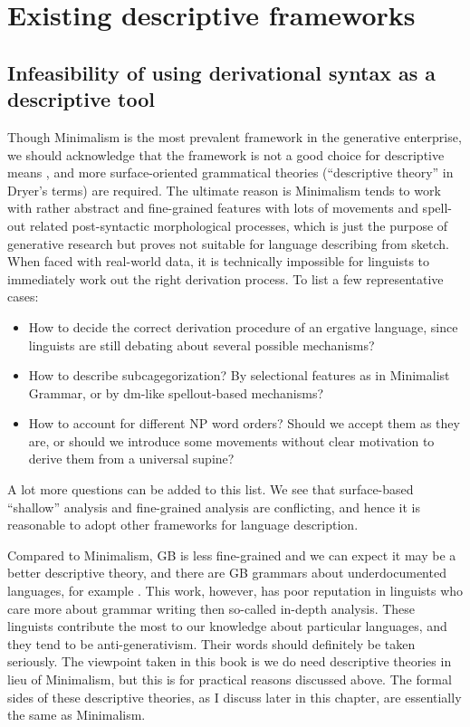 \documentclass[../main.tex]{subfiles}
\begin{document}
\section{Existing descriptive frameworks}\label{sec:descriptive-framework}

\subsection{Infeasibility of using derivational syntax as a descriptive tool}\label{sec:generative-no-good}

Though Minimalism is the most prevalent framework in the generative enterprise, we should acknowledge that 
the framework is not a good choice for descriptive means \citep{dryer2006descriptive}, and more surface-oriented
grammatical theories (``descriptive theory'' in Dryer's terms) are required. The ultimate reason is 
Minimalism tends to work with rather abstract and fine-grained features with lots of movements and spell-out related post-syntactic morphological processes, 
which is just the purpose of generative research but proves not suitable for language describing from sketch.
When faced with real-world data, it is technically impossible for linguists to immediately work out the right derivation process. To list a few representative cases:
\begin{itemize}
    \item  How to decide the correct derivation procedure of an ergative language, since 
    linguists are still debating about several possible mechanisms?
    \item How to describe subcagegorization? By selectional features as in Minimalist Grammar,
    or by \ac{dm}-like spellout-based mechanisms\citep{siddiqi2009syntax}?
    \item How to account for different NP word orders? Should we accept them as they are, or should we introduce 
    some movements without clear motivation \citep{cinque2005deriving} to derive them from a universal supine?
\end{itemize}
A lot more questions can be added to this list. We see that surface-based ``shallow'' analysis and fine-grained 
analysis are conflicting, and hence it is reasonable to adopt other frameworks for language description.

Compared to Minimalism, GB is less fine-grained and we can expect it may be a better descriptive theory,
and there are GB grammars about underdocumented languages, for example \citet{holmer1996parametric}. 
This work, however, has poor reputation in linguists 
who care more about grammar writing then so-called in-depth analysis.
These linguists contribute the most to our knowledge about particular languages, 
and they tend to be anti-generativism. Their words should definitely be taken seriously.
The viewpoint taken in this book is we do need descriptive theories in lieu of Minimalism,
but this is for practical reasons discussed above.
The formal sides of these descriptive theories, as I discuss later in this chapter, 
are essentially the same as Minimalism.
\end{document}

